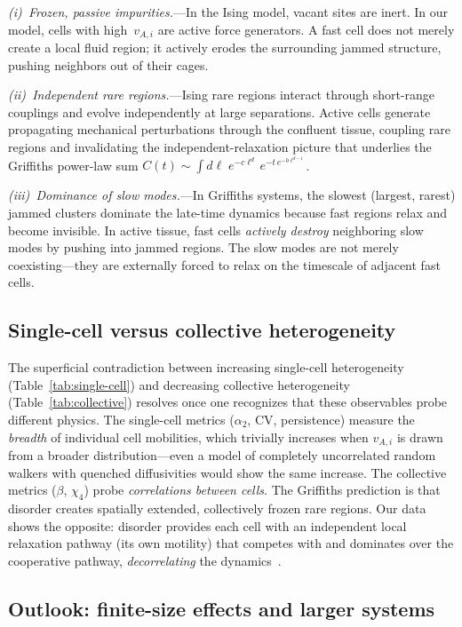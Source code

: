 \documentclass[aps,pre,twocolumn,superscriptaddress,longbibliography,floatfix]{revtex4-2}
\begin{document}
\textit{(i)~Frozen, passive impurities.}---In the Ising model, vacant
sites are inert.  In our model, cells with high~$v_{A,i}$ are active
force generators.  A fast cell does not merely create a local fluid
region; it actively erodes the surrounding jammed structure, pushing
neighbors out of their cages.

\textit{(ii)~Independent rare regions.}---Ising rare regions interact
through short-range couplings and evolve independently at large
separations.  Active cells generate propagating mechanical
perturbations through the confluent tissue, coupling rare regions and
invalidating the independent-relaxation picture that underlies the
Griffiths power-law sum
$C(t)\!\sim\!\int\! d\ell\;e^{-c\ell^d}\,e^{-t\,e^{-b\ell^{d-1}}}$.

\textit{(iii)~Dominance of slow modes.}---In Griffiths systems, the
slowest (largest, rarest) jammed clusters dominate the late-time
dynamics because fast regions relax and become invisible.  In active
tissue, fast cells \emph{actively destroy} neighboring slow modes by
pushing into jammed regions.  The slow modes are not merely
coexisting---they are externally forced to relax on the timescale of
adjacent fast cells.

\subsection{Single-cell versus collective heterogeneity}

The superficial contradiction between increasing single-cell
heterogeneity (Table~\ref{tab:single-cell}) and decreasing collective
heterogeneity (Table~\ref{tab:collective}) resolves once one
recognizes that these observables probe different physics.  The
single-cell metrics ($\alpha_2$, CV, persistence) measure the
\emph{breadth} of individual cell mobilities, which trivially increases
when $v_{A,i}$ is drawn from a broader distribution---even a model of
completely uncorrelated random walkers with quenched diffusivities
would show the same increase.  The collective metrics ($\beta$,
$\chi_4$) probe \emph{correlations between cells}.  The Griffiths
prediction is that disorder creates spatially extended, collectively
frozen rare regions.  Our data shows the opposite: disorder provides
each cell with an independent local relaxation pathway (its own
motility) that competes with and dominates over the cooperative
pathway, \emph{decorrelating} the dynamics~\cite{mandal2020}.

\subsection{Outlook: finite-size effects and larger systems}
\end{document}
